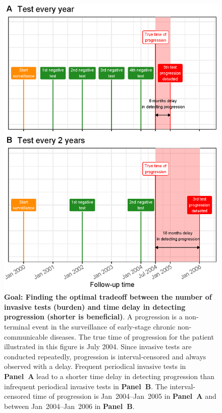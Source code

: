 \begin{figure}
\centerline{\includegraphics{images/delay_explanation.eps}}
\caption{\textbf{Goal: Finding the optimal tradeoff between the number of invasive tests (burden) and time delay in detecting progression (shorter is beneficial)}. A progression is a non-terminal event in the surveillance of early-stage chronic non-communicable diseases. The true time of progression for the patient illustrated in this figure is July 2004. Since invasive tests are conducted repeatedly, progression is interval-censored and always observed with a delay. Frequent periodical invasive tests in \textbf{Panel~A} lead to a shorter time delay in detecting progression than infrequent periodical invasive tests in \textbf{Panel~B}. The interval-censored time of progression is Jan~2004--Jan~2005 in \textbf{Panel~A} and between Jan~2004--Jan~2006 in \textbf{Panel~B}.} 
\label{fig:delay_explanation}
\end{figure}

